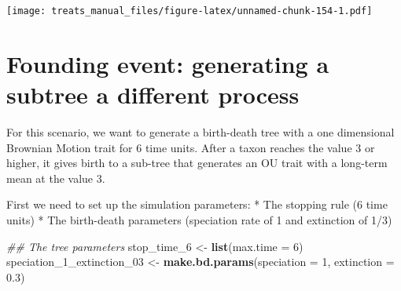 \documentclass[
]{book}
\newenvironment{Shaded}{\begin{snugshade}}{\end{snugshade}}
\newcommand{\CommentTok}[1]{\textcolor[rgb]{0.56,0.35,0.01}{\textit{#1}}}
\newcommand{\DataTypeTok}[1]{\textcolor[rgb]{0.13,0.29,0.53}{#1}}
\newcommand{\DecValTok}[1]{\textcolor[rgb]{0.00,0.00,0.81}{#1}}
\newcommand{\FloatTok}[1]{\textcolor[rgb]{0.00,0.00,0.81}{#1}}
\newcommand{\KeywordTok}[1]{\textcolor[rgb]{0.13,0.29,0.53}{\textbf{#1}}}
\newcommand{\NormalTok}[1]{#1}
\newcommand{\OperatorTok}[1]{\textcolor[rgb]{0.81,0.36,0.00}{\textbf{#1}}}
\newcommand{\OtherTok}[1]{\textcolor[rgb]{0.56,0.35,0.01}{#1}}
\newcommand{\StringTok}[1]{\textcolor[rgb]{0.31,0.60,0.02}{#1}}
\begin{document}
\begin{Shaded}
\end{Shaded}

\texttt{[image: treats\_manual\_files/figure-latex/unnamed-chunk-154-1.pdf]}

\hypertarget{EG_founding_traits}{%
\section{Founding event: generating a subtree a different process}\label{EG_founding_traits}}

For this scenario, we want to generate a birth-death tree with a one dimensional Brownian Motion trait for 6 time units.
After a taxon reaches the value 3 or higher, it gives birth to a sub-tree that generates an OU trait with a long-term mean at the value 3.

First we need to set up the simulation parameters:
* The stopping rule (6 time units)
* The birth-death parameters (speciation rate of 1 and extinction of 1/3)

\begin{Shaded}
\begin{Highlighting}[]
\CommentTok{\#\# The tree parameters}
\NormalTok{stop\_time\_}\DecValTok{6}\NormalTok{ \textless{}{-}}\StringTok{ }\KeywordTok{list}\NormalTok{(}\DataTypeTok{max.time =} \DecValTok{6}\NormalTok{)}
\NormalTok{speciation\_}\DecValTok{1}\NormalTok{\_extinction\_}\DecValTok{03}\NormalTok{ \textless{}{-}}\StringTok{ }\KeywordTok{make.bd.params}\NormalTok{(}\DataTypeTok{speciation =} \DecValTok{1}\NormalTok{,}
                                             \DataTypeTok{extinction =} \FloatTok{0.3}\NormalTok{)}
\end{Highlighting}
\end{Shaded}
\end{document}
